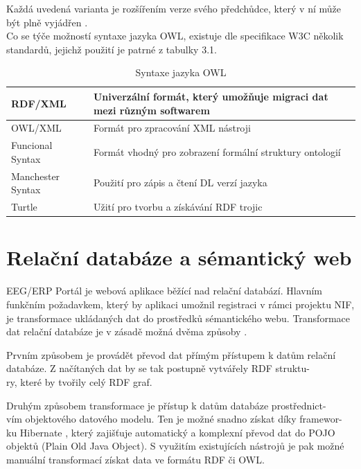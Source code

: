 \documentclass{projekt}
\begin{document}
Každá uvedená varianta je rozšířením verze svého předchůdce, který v ní může být plně vyjádřen \cite{sest}.\\
Co se týče možností syntaxe jazyka OWL, existuje dle specifikace W3C několik standardů, jejichž použití je patrné z tabulky 3.1.

\begin{table}[htbp!]

\label{značka tabulky}
\begin{center}
\begin{tabular}{|p{2.6cm}|p{10.0cm}|} 
\hline
RDF/XML &  Univerzální formát, který umožňuje migraci dat mezi různým softwarem\\
\hline
OWL/XML & Formát pro zpracování XML nástroji\\
\hline
Funcional Syntax & Formát vhodný pro zobrazení formální struktury ontologií\\
\hline
Manchester Syntax & Použití pro zápis a čtení DL verzí jazyka\\
\hline
Turtle & Užití pro tvorbu a získávání RDF trojic\\
\hline
\end{tabular}
\end{center}
\caption{Syntaxe jazyka OWL \cite{sedm}}
\end{table}

\chapter{Relační databáze a sémantický web}
\hspace{0.65cm}EEG/ERP Portál je webová aplikace běžící nad relační databází. Hlavním funkčním požadavkem, který by aplikaci umožnil registraci v rámci projektu NIF, je transformace ukládaných dat do prostředků sémantického webu. Transformace dat relační databáze je v zásadě možná dvěma způsoby \cite{diplomka}.

Prvním způsobem je provádět převod dat přímým přístupem k datům relační databáze. 
Z načítaných dat by se tak postupně vytvářely RDF struktu-\\ry, které by tvořily celý RDF graf.


Druhým způsobem transformace je přístup k datům databáze prostřednict-\\vím objektového datového modelu. Ten je možné snadno získat díky framewor-\\ku Hibernate \cite{osm}, který zajišťuje automatický a komplexní převod dat do POJO objektů (Plain Old Java Object). S využitím existujících nástrojů je pak možné manuální transformací získat data ve formátu RDF či OWL.
\end{document}
